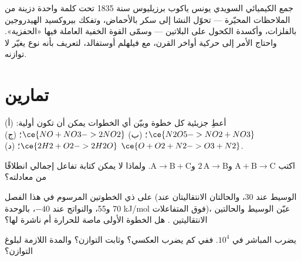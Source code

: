 \begin{history}[الحفز، 1835]
جمع الكيميائي السويدي يونس ياكوب برزيليوس سنة 1835 تحت كلمة واحدة
دزينة من الملاحظات المحيّرة --- تحوّل النشا إلى سكر بالأحماض،
وتفكك بيروكسيد الهيدروجين بالفلزات، وأكسدة الكحول على البلاتين ---
وسمّى القوة الخفية العاملة فيها «الحفزية». واحتاج الأمر إلى حركية
أواخر القرن، مع فيلهلم أوستفالد، لتعريف  بأنه
نوع يغيّر  لا توازنه.
\end{history}

\section{تمارين}

\begin{exercise}[$\star$]\label{exo:b1:elementary-steps:1}
أعطِ جزيئية كل خطوة وبيّن أي الخطوات يمكن أن تكون أولية:
(أ) $\ce{N2O5 -> NO2 + NO3}$؛ (ب) $\ce{NO + NO3 -> 2NO2}$؛
(ج) $\ce{2H2 + O2 -> 2H2O}$؛ (د) $\ce{O + O2 + N2 -> O3 + N2}$.
\end{exercise}

\begin{exercise}[$\star$]\label{exo:b1:elementary-steps:2}
اكتب   $\mathrm{A} + \mathrm{B} \to
\mathrm{C}$ و$2\,\mathrm{A} \to \mathrm{B}$ و$\mathrm{A} \to \mathrm{B} +
\mathrm{C}$. ولماذا لا يمكن كتابة  تفاعل إجمالي انطلاقًا من
معادلته؟
\end{exercise}

\begin{exercise}[$\star$]\label{exo:b1:elementary-steps:3}
على  ذي الخطوتين المرسوم في هذا الفصل (الوسيط عند
30، والحالتان الانتقاليتان عند 70 و55، والنواتج عند $-40$، بالوحدة
\unit{kJ/mol} فوق المتفاعلات)، عيّن الوسيط
والحالتين الانتقاليتين . هل الخطوة الأولى ماصة للحرارة أم ناشرة لها؟
\end{exercise}

\begin{exercise}[$\star$]\label{exo:b1:elementary-steps:4}
يضرب   المباشر  في
$10^4$. ففي كم يضرب  العكسي؟ وثابت
التوازن؟ والمدة اللازمة لبلوغ التوازن؟
\end{exercise}

